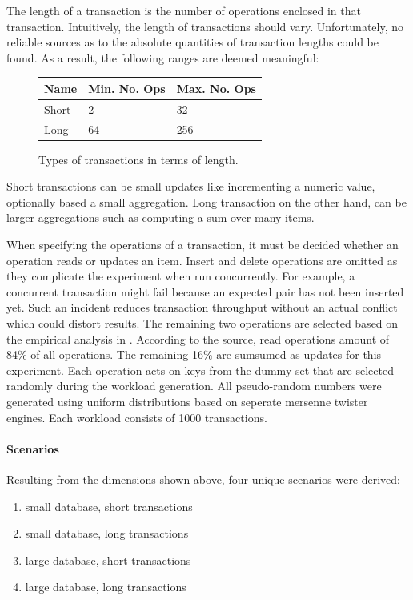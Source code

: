 The length of a transaction is the number of operations enclosed in that
transaction. Intuitively, the length of transactions should vary. Unfortunately,
no reliable sources as to the absolute quantities of transaction lengths could
be found. As a result, the following ranges are deemed meaningful:

\begin{figure}[!h]
    \centering
    \begin{tabular}{|l|l|l|}
        \hline
        \textbf{Name} & \textbf{Min. No. Ops} & \textbf{Max. No. Ops} \\
        \hline
        Short         & 2  & 32  \\
        Long          & 64 & 256 \\
        \hline
    \end{tabular}
    \caption{Types of transactions in terms of length.}
    \label{tab:tx-length}
\end{figure}

Short transactions can be small updates like incrementing a numeric value,
optionally based a small aggregation. Long transaction on the other hand, can be
larger aggregations such as computing a sum over many items.

When specifying the operations of a transaction, it must be decided whether an
operation reads or updates an item. Insert and delete operations are omitted as
they complicate the experiment when run concurrently. For example, a concurrent
transaction might fail because an expected pair has not been inserted yet. Such
an incident reduces transaction throughput without an actual conflict which
could distort results. The remaining two operations are selected based on the
empirical analysis in \cite{andrei2017sap}. According to the source, read
operations amount of 84\% of all operations. The remaining 16\% are sumsumed as
updates for this experiment. Each operation acts on keys from the dummy set that
are selected randomly during the workload generation. All pseudo-random numbers
were generated using uniform distributions based on seperate mersenne twister
engines. Each workload consists of 1000 transactions.

\paragraph{Scenarios}

Resulting from the dimensions shown above, four unique scenarios  were derived:

\begin{enumerate}
    \item small database, short transactions
    \item small database, long transactions
    \item large database, short transactions
    \item large database, long transactions
\end{enumerate}

